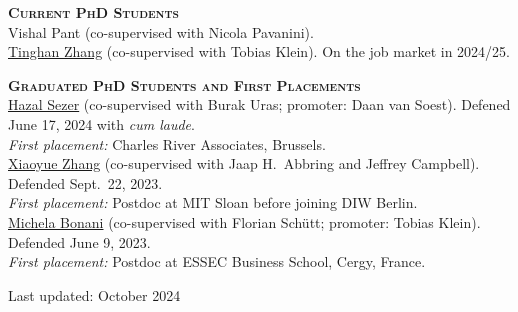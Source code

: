 \documentclass[11pt,overlapped,line,letterpaper]{article}
\newcommand{\cvsec}[1]{\vspace{\baselineskip}\textbf{\textsc{#1}}}
\begin{document}
\cvsec{Current PhD Students}\smallskip \\
Vishal Pant (co-supervised with Nicola Pavanini). \smallskip\\
\href{https://tinghan-zhang.github.io/}{Tinghan Zhang} (co-supervised with Tobias Klein). On the job market in 2024/25.

\newpage
\cvsec{Graduated PhD Students and First Placements}\smallskip \\
\href{https://hazalsezer.com/}{Hazal Sezer} (co-supervised with Burak Uras; promoter: Daan van Soest). Defened June 17, 2024 with \emph{cum laude}.\\
\emph{First placement:} Charles River Associates, Brussels.\smallskip\\
\href{https://www.xiaoyuezhang.net/}{Xiaoyue Zhang} (co-supervised with Jaap H.~Abbring and Jeffrey Campbell). Defended Sept.~22, 2023.\\
\emph{First placement:} Postdoc at MIT Sloan before joining DIW Berlin.\smallskip\\
\href{https://www.michelabonani.com/}{Michela Bonani} (co-supervised with Florian Schütt; promoter: Tobias Klein). Defended June 9, 2023. \\
\emph{First placement:} Postdoc at ESSEC Business School, Cergy, France.



\begin{flushright}
  Last updated: October 2024
\end{flushright}
\end{document}
